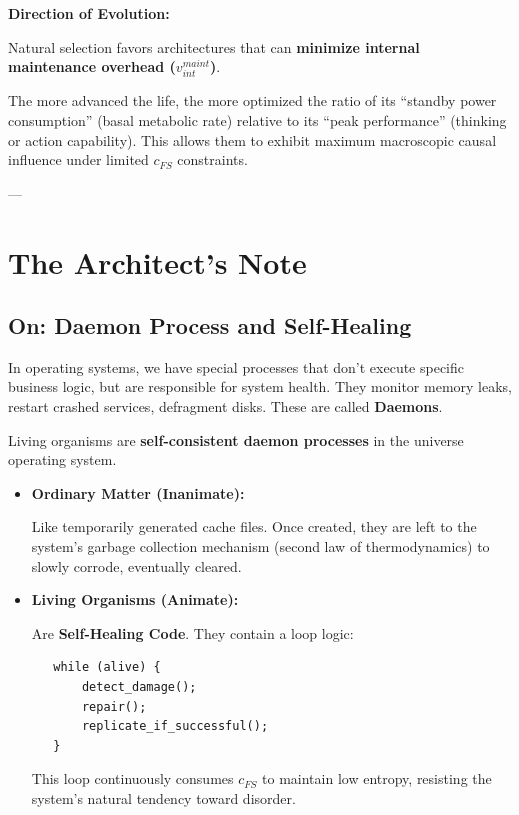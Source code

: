 \documentclass[11pt,a4paper,twoside]{book}
\begin{document}
\textbf{Direction of Evolution:}

Natural selection favors architectures that can \textbf{minimize internal maintenance overhead ($v_{int}^{maint}$)}.

The more advanced the life, the more optimized the ratio of its ``standby power consumption'' (basal metabolic rate) relative to its ``peak performance'' (thinking or action capability). This allows them to exhibit maximum macroscopic causal influence under limited $c_{FS}$ constraints.

---

\section{The Architect's Note}

\subsection{On: Daemon Process and Self-Healing}

In operating systems, we have special processes that don't execute specific business logic, but are responsible for system health. They monitor memory leaks, restart crashed services, defragment disks. These are called \textbf{Daemons}.

Living organisms are \textbf{self-consistent daemon processes} in the universe operating system.

\begin{itemize}
\item \textbf{Ordinary Matter (Inanimate):}

   Like temporarily generated cache files. Once created, they are left to the system's garbage collection mechanism (second law of thermodynamics) to slowly corrode, eventually cleared.

\item \textbf{Living Organisms (Animate):}

   Are \textbf{Self-Healing Code}. They contain a loop logic:

   \begin{verbatim}
   while (alive) {
       detect_damage();
       repair();
       replicate_if_successful();
   }
   \end{verbatim}

   This loop continuously consumes $c_{FS}$ to maintain low entropy, resisting the system's natural tendency toward disorder.
\end{itemize}
\end{document}
